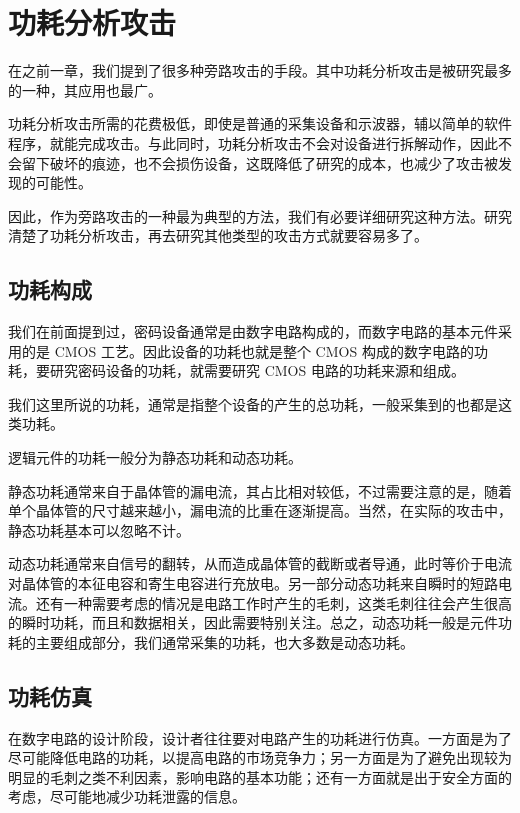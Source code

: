 
\chapter{功耗分析攻击}
在之前一章，我们提到了很多种旁路攻击的手段。其中功耗分析攻击是被研究最多的一种，其应用也最广。

功耗分析攻击所需的花费极低，即使是普通的采集设备和示波器，辅以简单的软件程序，就能完成攻击。与此同时，功耗分析攻击不会对设备进行拆解动作，因此不会留下破坏的痕迹，也不会损伤设备，这既降低了研究的成本，也减少了攻击被发现的可能性。

因此，作为旁路攻击的一种最为典型的方法，我们有必要详细研究这种方法。研究清楚了功耗分析攻击，再去研究其他类型的攻击方式就要容易多了。

\section{功耗构成}  %
我们在前面提到过，密码设备通常是由数字电路构成的，而数字电路的基本元件采用的是 CMOS 工艺。因此设备的功耗也就是整个 CMOS 构成的数字电路的功耗，要研究密码设备的功耗，就需要研究 CMOS 电路的功耗来源和组成。

我们这里所说的功耗，通常是指整个设备的产生的总功耗，一般采集到的也都是这类功耗。

逻辑元件的功耗一般分为静态功耗和动态功耗。

静态功耗通常来自于晶体管的漏电流，其占比相对较低，不过需要注意的是，随着单个晶体管的尺寸越来越小，漏电流的比重在逐渐提高。当然，在实际的攻击中，静态功耗基本可以忽略不计。

动态功耗通常来自信号的翻转，从而造成晶体管的截断或者导通，此时等价于电流对晶体管的本征电容和寄生电容进行充放电。另一部分动态功耗来自瞬时的短路电流。还有一种需要考虑的情况是电路工作时产生的毛刺，这类毛刺往往会产生很高的瞬时功耗，而且和数据相关，因此需要特别关注。总之，动态功耗一般是元件功耗的主要组成部分，我们通常采集的功耗，也大多数是动态功耗。


\section{功耗仿真}  %
在数字电路的设计阶段，设计者往往要对电路产生的功耗进行仿真。一方面是为了尽可能降低电路的功耗，以提高电路的市场竞争力；另一方面是为了避免出现较为明显的毛刺之类不利因素，影响电路的基本功能；还有一方面就是出于安全方面的考虑，尽可能地减少功耗泄露的信息。

